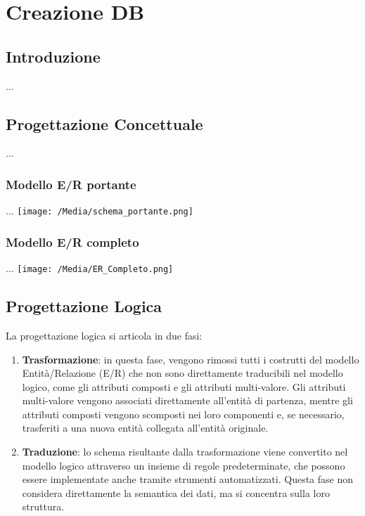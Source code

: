 \documentclass{article}
\begin{document}
\section{Creazione DB}

\subsection{Introduzione}

...

\subsection{Progettazione Concettuale}

...

\subsubsection{Modello E/R portante}

...
\texttt{[image: /Media/schema\_portante.png]}

\subsubsection{Modello E/R completo}

...
\texttt{[image: /Media/ER\_Completo.png]}

\subsection{Progettazione Logica}

La progettazione logica si articola in due fasi:

\begin{enumerate}
    \item \textbf{Trasformazione}: in questa fase, vengono rimossi tutti i costrutti del modello Entità/Relazione (E/R) che non sono direttamente traducibili nel modello logico, come gli attributi composti e gli attributi multi-valore. Gli attributi multi-valore vengono associati direttamente all’entità di partenza, mentre gli attributi composti vengono scomposti nei loro componenti e, se necessario, trasferiti a una nuova entità collegata all’entità originale.
    \item \textbf{Traduzione}: lo schema risultante dalla trasformazione viene convertito nel modello logico attraverso un insieme di regole predeterminate, che possono essere implementate anche tramite strumenti automatizzati. Questa fase non considera direttamente la semantica dei dati, ma si concentra sulla loro struttura.
\end{enumerate}
\end{document}
